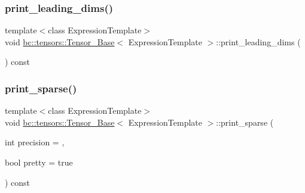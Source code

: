 \subsubsection{\texorpdfstring{print\+\_\+leading\+\_\+dims()}{print\_leading\_dims()}}
{\footnotesize\ttfamily template$<$class Expression\+Template$>$ \\
void \hyperlink{classbc_1_1tensors_1_1Tensor__Base}{bc\+::tensors\+::\+Tensor\+\_\+\+Base}$<$ Expression\+Template $>$\+::print\+\_\+leading\+\_\+dims (\begin{DoxyParamCaption}{ }\end{DoxyParamCaption}) const\hspace{0.3cm}{\ttfamily [inline]}}

\mbox{\label{classbc_1_1tensors_1_1Tensor__Base_afb967f955b7d94975e0772708f9089f8}} 
\subsubsection{\texorpdfstring{print\+\_\+sparse()}{print\_sparse()}}
{\footnotesize\ttfamily template$<$class Expression\+Template$>$ \\
void \hyperlink{classbc_1_1tensors_1_1Tensor__Base}{bc\+::tensors\+::\+Tensor\+\_\+\+Base}$<$ Expression\+Template $>$\+::print\+\_\+sparse (\begin{DoxyParamCaption}\item[{int}]{precision = {},  }\item[{bool}]{pretty = {\ttfamily true} }\end{DoxyParamCaption}) const\hspace{0.3cm}{\ttfamily [inline]}}

\mbox{\label{classbc_1_1tensors_1_1Tensor__Base_ae49f60c020a5180113d54a379a886eb4}} 
